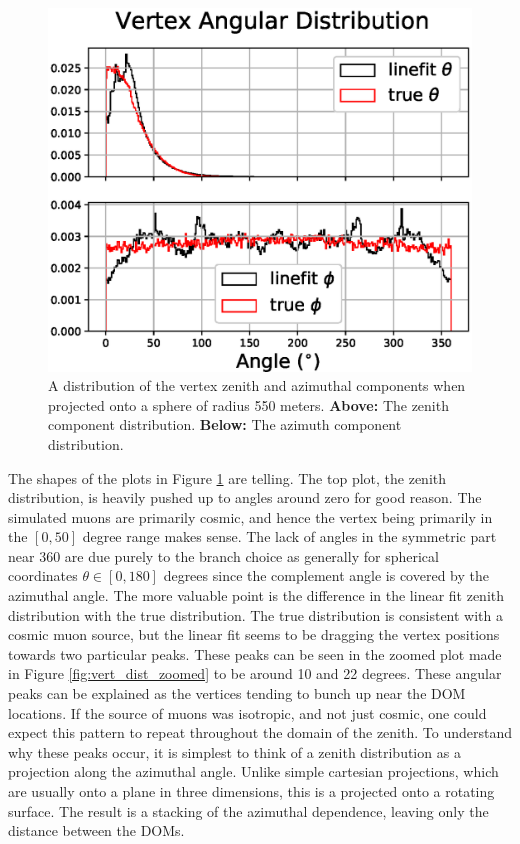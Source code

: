 \begin{figure}[H]
  \centering
  \includegraphics[width=12cm]{./Figures/reco_plots/angular_vert_dist_modified.eps}
  \caption{A distribution of the vertex zenith and azimuthal components when projected onto a sphere of radius 550 meters. \textbf{Above:} The zenith component distribution. \textbf{Below:} The azimuth component distribution.}
  \label{fig:vert_dist}
\end{figure}

The shapes of the plots in Figure \ref{fig:vert_dist} are telling. The top plot, the zenith distribution, is heavily pushed up to angles around zero for good reason. The simulated muons are primarily cosmic, and hence the vertex being primarily in the $[0, 50]$ degree range makes sense. The lack of angles in the symmetric part near 360 are due purely to the branch choice as generally for spherical coordinates $\theta \in [0,180]$ degrees since the complement angle is covered by the azimuthal angle. The more valuable point is the difference in the linear fit zenith distribution with the true distribution. The true distribution is consistent with a cosmic muon source, but the linear fit seems to be dragging the vertex positions towards two particular peaks. These peaks can be seen in the zoomed plot made in Figure \ref{fig:vert_dist_zoomed} to be around 10 and 22 degrees. These angular peaks can be explained as the vertices tending to bunch up near the DOM locations. If the source of muons was isotropic, and not just cosmic, one could expect this pattern to repeat throughout the domain of the zenith. To understand why these peaks occur, it is simplest to think of a zenith distribution as a projection along the azimuthal angle. Unlike simple cartesian projections, which are usually onto a plane in three dimensions, this is a projected onto a rotating surface. The result is a stacking of the azimuthal dependence, leaving only the distance between the DOMs. 

